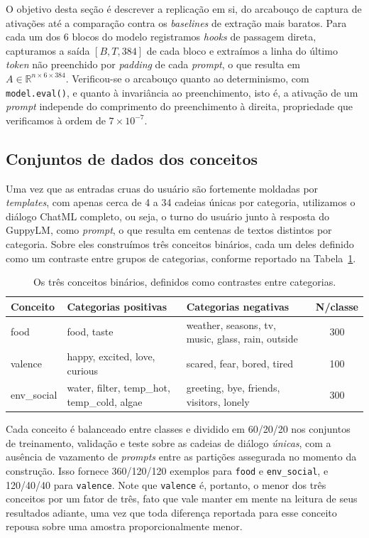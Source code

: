O objetivo desta seção é descrever a replicação em si, do arcabouço de captura de
ativações até a comparação contra os \textit{baselines} de extração mais baratos. Para
cada um dos 6 blocos do modelo registramos \textit{hooks} de passagem direta, capturamos a
saída $[B, T, 384]$ de cada bloco e extraímos a linha do último \textit{token} não
preenchido por \textit{padding} de cada \textit{prompt}, o que resulta em
$A \in \mathbb{R}^{n \times 6 \times384}$. Verificou-se o arcabouço quanto ao
determinismo, com \verb|model.eval()|, e quanto à invariância ao preenchimento, isto é, a
ativação de um \textit{prompt} independe do comprimento do preenchimento à direita,
propriedade que verificamos à ordem de $7\times 10^{-7}$.

\subsection{Conjuntos de dados dos conceitos}

Uma vez que as entradas cruas do usuário são fortemente moldadas por \textit{templates},
com apenas cerca de 4 a 34 cadeias únicas por categoria, utilizamos o diálogo ChatML
completo, ou seja, o turno do usuário junto à resposta do GuppyLM, como \textit{prompt}, o
que resulta em centenas de textos distintos por categoria. Sobre eles construímos três
conceitos binários, cada um deles definido como um contraste entre grupos de categorias,
conforme reportado na Tabela~\ref{tab:concept_categories}.


\begin{table}[htbp]
\centering
\caption{Os três conceitos binários, definidos como contrastes entre categorias.}
\label{tab:concept_categories}
\begin{tabular}{@{}l p{4.2cm} p{4.6cm} c@{}}
\toprule
\textbf{Conceito}& \textbf{Categorias positivas} & \textbf{Categorias negativas} & \textbf{N/classe} \\
\midrule
food &  food, taste & weather, seasons, tv, music, glass, rain, outside & 300 \\
valence &  happy, excited, love, curious & scared, fear, bored, tired & 100 \\
env\_social &  water, filter, temp\_hot, temp\_cold, algae & greeting, bye, friends, visitors, lonely & 300 \\
\bottomrule
\end{tabular}
\end{table}

Cada conceito é balanceado entre classes e dividido em 60/20/20 nos conjuntos de
treinamento, validação e teste sobre as cadeias de diálogo \emph{únicas}, com a ausência
de vazamento de \textit{prompts} entre as partições assegurada no momento da construção.
Isso fornece 360/120/120 exemplos para \verb|food| e \verb|env_social|, e 120/40/40 para
\verb|valence|. Note que \verb|valence| é, portanto, o menor dos três conceitos por um
fator de três, fato que vale manter em mente na leitura de seus resultados adiante, uma
vez que toda diferença reportada para esse conceito repousa sobre uma amostra
proporcionalmente menor.

